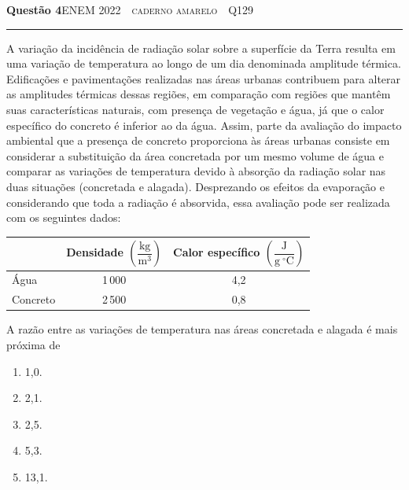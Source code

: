 \documentclass[11pt,a4paper]{article}
\newcommand{\fonte}[1]{{\small\scshape\color{grafite}#1}}
\newenvironment{questao}[2]{%
  \needspace{6\baselineskip}
  \par\addvspace{1.6em}
  {\large\bfseries\color{vinho}Quest\~ao #1}\hfill #2\\[-0.55em]
  {\color{black!25}\rule{\linewidth}{0.4pt}}
  \par\nobreak\smallskip
}{\par\addvspace{0.4em}}
\begin{document}
\begin{questao}{4}{\fonte{ENEM 2022 \,\textperiodcentered\, caderno amarelo \,\textperiodcentered\, Q129}}
A varia\c{c}\~ao da incid\^encia de radia\c{c}\~ao solar sobre a superf\'icie da
Terra resulta em uma varia\c{c}\~ao de temperatura ao longo de um dia
denominada amplitude t\'ermica. Edifica\c{c}\~oes e pavimenta\c{c}\~oes realizadas
nas \'areas urbanas contribuem para alterar as amplitudes t\'ermicas dessas
regi\~oes, em compara\c{c}\~ao com regi\~oes que mant\^em suas caracter\'isticas
naturais, com presen\c{c}a de vegeta\c{c}\~ao e \'agua, j\'a que o calor
espec\'ifico do concreto \'e inferior ao da \'agua. Assim, parte da
avalia\c{c}\~ao do impacto ambiental que a presen\c{c}a de concreto proporciona
\`as \'areas urbanas consiste em considerar a substitui\c{c}\~ao da \'area
concretada por um mesmo volume de \'agua e comparar as varia\c{c}\~oes de
temperatura devido \`a absor\c{c}\~ao da radia\c{c}\~ao solar nas duas situa\c{c}\~oes
(concretada e alagada). Desprezando os efeitos da evapora\c{c}\~ao e
considerando que toda a radia\c{c}\~ao \'e absorvida, essa avalia\c{c}\~ao pode ser
realizada com os seguintes dados:

\begin{center}
{\renewcommand{\arraystretch}{1.5}
\begin{tabular}{@{}lcc@{}}
  \toprule
   & Densidade $\left(\dfrac{\mathrm{kg}}{\mathrm{m}^3}\right)$
   & Calor espec\'ifico $\left(\dfrac{\mathrm{J}}{\mathrm{g}\ ^\circ\mathrm{C}}\right)$ \\
  \midrule
  \'Agua    & 1\,000 & 4,2 \\
  Concreto  & 2\,500 & 0,8 \\
  \bottomrule
\end{tabular}}
\end{center}

A raz\~ao entre as varia\c{c}\~oes de temperatura nas \'areas concretada e
alagada \'e mais pr\'oxima de
\begin{enumerate}
  \item 1,0.
  \item 2,1.
  \item 2,5.
  \item 5,3.
  \item 13,1.
\end{enumerate}
\end{questao}
\end{document}

